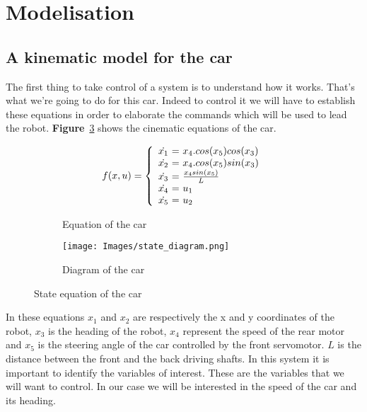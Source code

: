 \section{Modelisation}

\subsection{A kinematic model for the car}
The first thing to take control of a system is to understand how it
works. That's what we're going to do for this car. Indeed to control
it we will have to establish these equations in order to elaborate
the commands which will be used to lead the robot. \textbf{Figure}~\ref{fig:state}
shows the cinematic equations of the car.

\begin{figure}[!ht]
    \centering
    \begin{subfigure}[b]{0.45\textwidth}
        \centering
        
            $$ f(x, u) = \left \{
            \begin{array}{c @{=} l}
                \dot{x_1}\ & \ x_4.cos(x_5) cos(x_3) \\
                \dot{x_2}\ & \ x_4.cos(x_5) sin(x_3) \\
                \dot{x_3}\ & \ \frac{x_4 sin(x_5)}{L} \\
                \dot{x_4}\ & \ u_1 \\
                \dot{x_5}\ & \ u_2 
            \end{array}
            \right. $$
        
        \caption{Equation of the car}
        \label{eqn:state}
    \end{subfigure}
    \hfill
    \begin{subfigure}[b]{0.45\textwidth}
        \centering
        \texttt{[image: Images/state\_diagram.png]}
        \caption{Diagram of the car}
        \label{fig:raspi_config}
    \end{subfigure}
    \caption{State equation of the car}
    \label{fig:state}
\end{figure}



In these equations $x_1$ and $x_2$ are respectively the x and y
coordinates of the robot, $x_3$ is the heading of the robot, $x_4$
represent the speed of the rear motor and $x_5$ is the steering angle
of the car controlled by the front servomotor. $L$ is the distance between
the front and the back driving shafts. In this system it is
important to identify the variables of interest. These are the variables
that we will want to control. In our case we will be interested in the 
speed of the car and its heading.

